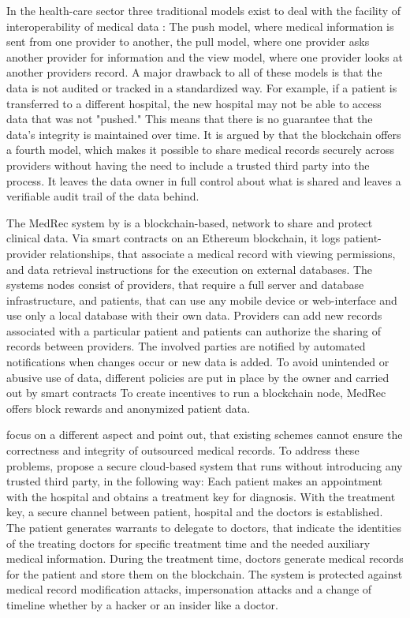 In the health-care sector three traditional models exist to deal with the facility of interoperability of medical data \cite{Kshetri2017}: The push model, where medical information is sent from one provider to another, the pull model, where one provider asks another provider for information and the view model, where one provider looks at another providers record.
A major drawback to all of these models is that the data is not audited or tracked in a standardized way. For example, if a patient is transferred to a different hospital, the new hospital may not be able to access data that was not "pushed." This means that there is no guarantee that the data's integrity is maintained over time.
It is argued by \cite{Kshetri2017} that the blockchain offers a fourth model, which makes it possible to share medical records securely across providers without having the need to include a trusted third party into the process. It leaves the data owner in full control about what is shared and leaves a verifiable audit trail of the data behind. \cite{Kshetri2017}

The MedRec system by \cite{Azaria2016} is a blockchain-based, network to share and protect clinical data. Via smart contracts on an Ethereum blockchain, it logs patient-provider relationships, that associate a medical record with viewing permissions, and data retrieval instructions for the execution on external databases.
The systems nodes consist of providers, that require a full server and database infrastructure, and patients, that can use any mobile device or web-interface and use only a local database with their own data.
Providers can add new records associated with a particular patient and patients can authorize the sharing of records between providers. The involved parties are notified by automated notifications when changes occur or new data is added. To avoid unintended or abusive use of data, different policies are put in place by the owner and carried out by smart contracts
To create incentives to run a blockchain node, MedRec offers block rewards and anonymized patient data.

\cite{Cao2019} focus on a different aspect and point out, that existing schemes cannot ensure the correctness and integrity of outsourced medical records. 
To address these problems, \cite{Cao2019} propose a secure cloud-based system that runs without introducing any trusted third party, in the following way:
 Each patient makes an appointment with the hospital and obtains a treatment key for diagnosis. With the treatment key, a secure channel between patient, hospital and the doctors is established. 
The patient generates warrants to delegate to doctors, that indicate the identities of the treating doctors for specific treatment time and the needed auxiliary medical information.\cite{Cao2019}
During the treatment time, doctors generate medical records for the patient and store them on the blockchain.\cite{Cao2019}
The system is protected against medical record modification attacks, impersonation attacks and a change of timeline whether by a hacker or an insider like a doctor.

